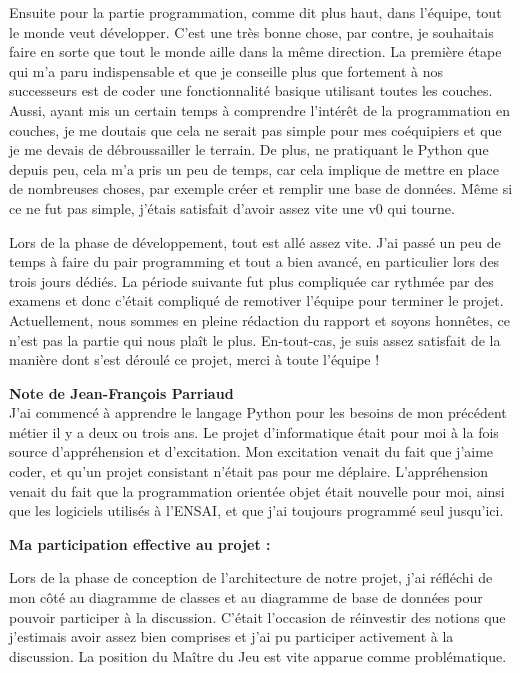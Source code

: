 \documentclass[11pt]{article}
\begin{document}
Ensuite pour la partie programmation, comme dit plus haut, dans l'équipe, tout le monde veut développer. C'est une très bonne chose, par contre, je souhaitais faire en sorte que tout le monde aille dans la même direction. La première étape qui m'a paru indispensable et que je conseille plus que fortement à nos successeurs est de coder une fonctionnalité basique utilisant toutes les couches. Aussi, ayant mis un certain temps à comprendre l'intérêt de la programmation en couches, je me doutais que cela ne serait pas simple pour mes coéquipiers et que je me devais de débroussailler le terrain. De plus, ne pratiquant le Python que depuis peu, cela m'a pris un peu de temps, car cela implique de mettre en place de nombreuses choses, par exemple créer et remplir une base de données. Même si ce ne fut pas simple, j'étais satisfait d'avoir assez vite une v0 qui tourne.

\bigbreak

Lors de la phase de développement, tout est allé assez vite. J'ai passé un peu de temps à faire du pair programming et tout a bien avancé, en particulier lors des trois jours dédiés. La période suivante fut plus compliquée car rythmée par des examens et donc c'était compliqué de remotiver l'équipe pour terminer le projet. Actuellement, nous sommes en pleine rédaction du rapport et soyons honnêtes, ce n'est pas la partie qui nous plaît le plus. En-tout-cas, je suis assez satisfait de la manière dont s'est déroulé ce projet, merci à toute l'équipe !



\newpage

\textbf{\Large Note de Jean-François Parriaud}\\

J'ai commencé à apprendre le langage Python pour les besoins de mon précédent métier il y a deux ou trois ans. Le projet d’informatique était pour moi à la fois source d'appréhension et d'excitation. Mon excitation venait du fait que j'aime coder, et qu'un projet consistant n'était pas pour me déplaire. L'appréhension venait du fait que la programmation orientée objet était nouvelle pour moi, ainsi que les logiciels utilisés à l'ENSAI, et que j'ai toujours programmé seul jusqu'ici.

\bigbreak
\textbf{ Ma participation effective au projet : }

Lors de la phase de conception de l’architecture de notre projet,
j'ai réfléchi de mon côté au diagramme de classes et au diagramme de base de données pour pouvoir participer à la discussion. C'était l'occasion de réinvestir des notions que j'estimais avoir assez bien comprises et j'ai pu participer activement à la discussion. La position du Maître du Jeu est vite apparue comme problématique.\\
\end{document}
